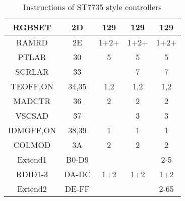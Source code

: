 \documentclass[pdftex,12pt,a4paper,oneside,english]{report}
\begin{document}
\begin{table}[H]
\begin{center}
\begin{tabular}{| c | c || c | c | c |}
    \hline
    RGBSET      & 2D    &    129     &    129     &   129      \\
    \hline
    RAMRD       & 2E    &     1+2+   &     1+2+   &    1+2+    \\
    \hline
    PTLAR       & 30    &     5      &     5      &    5       \\
    \hline
    SCRLAR      & 33    &            &     7      &    7       \\
    \hline
    TEOFF,ON    & 34,35 &    1,2     &     1,2    &    1,2     \\
    \hline
    MADCTR      & 36    &     2      &     2      &    2       \\
    \hline
    VSCSAD      & 37    &            &     3      &    3       \\
    \hline
    IDMOFF,ON   & 38,39 &    1       &     1      &    1       \\
    \hline
    COLMOD      & 3A    &     2      &     2      &    2       \\
    \hline
    Extend1     & B0-D9 &            &            &    2-5     \\
    \hline
    RDID1-3     & DA-DC &    1+2     &     1+2    &    1+2     \\
    \hline
    Extend2     & DE-FF &            &            &    2-65    \\
    \hline
    \end{tabular}
  \end{center}
  \caption{Instructions of ST7735 style controllers}
  \label{tab:st7733}
\end{table}
\end{document}
